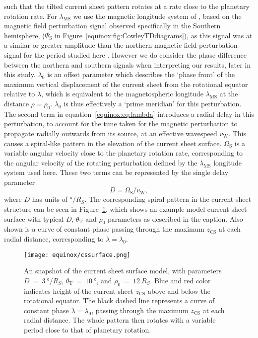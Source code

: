 such that the tilted current sheet pattern rotates at a rate close to the planetary rotation rate. For $\lambda_\mathrm{MS}$ we use the magnetic longitude system of \citet{andrews2012}, based on the magnetic field perturbation signal observed specifically in the Southern hemisphere, ($\Psi_\mathrm{S}$ in Figure~\ref{equinox:fig:CowleyTDdiagrams}), as this signal was at a similar or greater amplitude than the northern magnetic field perturbation signal for the period studied here \citep{andrews2012}. However we do consider the phase difference between the northern and southern signals when interpreting our results, later in this study. $\lambda_0$ is an offset parameter which describes the `phase front' of the maximum vertical displacement of the current sheet from the rotational equator relative to $\lambda$, which is equivalent to the magnetospheric longitude $\lambda_\mathrm{MS}$ at the distance $\rho = \rho_0$. $\lambda_0$ is thus effectively a `prime meridian' for this perturbation. The second term in equation~\ref{equinox:eq:lambda} introduces a radial delay in this perturbation, to account for the time taken for the magnetic perturbation to propagate radially outwards from its source, at an effective wavespeed $v_\mathrm{W}$. This causes a spiral-like pattern in the elevation of the current sheet surface. $\Omega_\mathrm{S}$ is a variable angular velocity close to the planetary rotation rate, corresponding to the angular velocity of the rotating perturbation defined by the $\lambda_\mathrm{MS}$ longitude system used here. These two terms can be represented by the single delay parameter
\begin{equation}\label{equinox:eq:D}
D = \Omega_\mathrm{S}/v_\mathrm{W},
\end{equation}
where $D$ has units of $\si{\degree/R_S}$. The corresponding spiral pattern in the current sheet structure can be seen in Figure~\ref{equinox:fig:cssurfacemodel}, which shows an example model current sheet surface with typical $D$, $\theta_\mathrm{T}$ and $\rho_0$ parameters as described in the caption. Also shown is a curve of constant phase passing through the maximum $z_\mathrm{CS}$ at each radial distance, corresponding to $\lambda=\lambda_0$.
\begin{figure}
\centering
\texttt{[image: equinox/cssurface.png]}
\caption[Snapshot of tilted, rippled current sheet surface model.]{An snapshot of the current sheet surface model, with parameters $D~{=}~\SI{3}{\degree/R_S}$, $\theta_\mathrm{T}~{=}~\SI{10}{\degree}$, and $\rho_0~{=}~\SI{12}{R_S}$. Blue and red color indicates height of the current sheet $z_\mathrm{CS}$ above and below the rotational equator. The black dashed line represents a curve of constant phase $\lambda = \lambda_0$, passing through the maximum $z_\mathrm{CS}$ at each radial distance. The whole pattern then rotates with a variable period close to that of planetary rotation.}
\label{equinox:fig:cssurfacemodel}
\end{figure}

